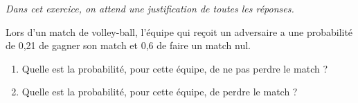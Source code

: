\begin{minipage}{0.99\linewidth}


\exo

\emph{Dans cet exercice, on attend une justification de toutes les réponses.}

Lors d'un match de volley-ball, l'équipe qui reçoit un adversaire a une probabilité de 0,21 de gagner son match et 0,6 de faire un match nul.

\begin{enumerate}
	\item Quelle est la probabilité, pour cette équipe, de ne pas perdre le match ?
	\item Quelle est la probabilité, pour cette équipe, de perdre le match ?
\end{enumerate}

\end{minipage}

\vspace{0.5cm}
